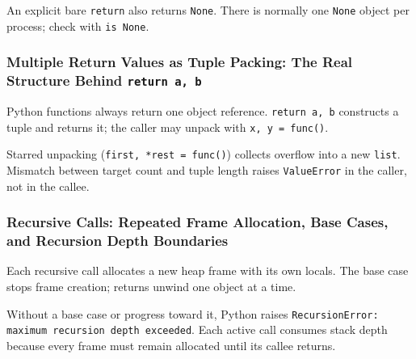 

An explicit bare \texttt{return} also returns \texttt{None}. There is normally one \texttt{None} object per process; check with \texttt{is None}.

\subsubsection{Multiple Return Values as Tuple Packing: The Real Structure Behind \texttt{return a, b}}

Python functions always return one object reference. \texttt{return a, b} constructs a tuple and returns it; the caller may unpack with \texttt{x, y = func()}.



Starred unpacking (\texttt{first, *rest = func()}) collects overflow into a new \texttt{list}. Mismatch between target count and tuple length raises \texttt{ValueError} in the caller, not in the callee.

\subsubsection{Recursive Calls: Repeated Frame Allocation, Base Cases, and Recursion Depth Boundaries}

Each recursive call allocates a new heap frame with its own locals. The base case stops frame creation; returns unwind one object at a time.



Without a base case or progress toward it, Python raises \texttt{RecursionError: maximum recursion depth exceeded}. Each active call consumes stack depth because every frame must remain allocated until its callee returns.
